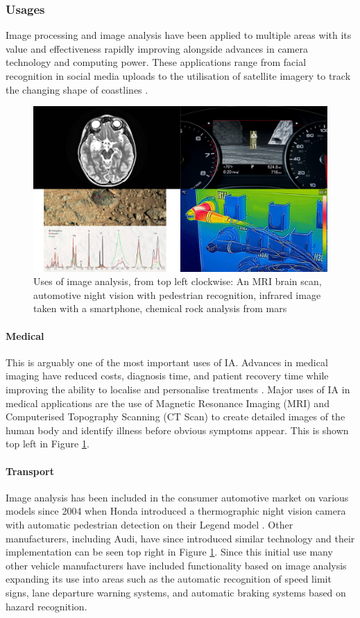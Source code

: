 	\subsubsection{Usages}
		Image processing and image analysis have been applied to multiple areas with its value and effectiveness rapidly improving alongside advances in camera technology and computing power. These applications range from facial recognition in social media uploads \citep{zuckerberg2011tagging} to the utilisation of satellite imagery to track the changing shape of coastlines \citep{costalimagery}.
		\begin{figure}[h!]
			\centering
			\includegraphics[width=15cm]{../images/4panel.png}
			\caption[Uses of image analysis]{Uses of image analysis, from top left clockwise: An MRI brain scan, automotive night vision with pedestrian recognition, infrared image taken with a smartphone, chemical rock analysis from mars}
			\label{fig:analysis_uses}
		\end{figure}
		\paragraph{Medical}
			This is arguably one of the most important uses of IA. Advances in medical imaging have reduced costs, diagnosis time, and patient recovery time while improving the ability to localise and personalise treatments \citep{esfmedical}. Major uses of IA in medical applications are the use of Magnetic Resonance Imaging (MRI) and Computerised Topography Scanning (CT Scan) to create detailed images of the human body and identify illness before obvious symptoms appear. This is shown top left in Figure \ref{fig:analysis_uses}.
		\paragraph{Transport}
			Image analysis has been included in the consumer automotive market on various models since 2004 when Honda introduced a thermographic night vision camera with automatic pedestrian detection on their Legend model \citep{hondanightvision}. Other manufacturers, including Audi, have since introduced similar technology and their implementation can be seen top right in Figure \ref{fig:analysis_uses}. Since this initial use many other vehicle manufacturers have included functionality based on image analysis expanding its use into areas such as the automatic recognition of speed limit signs, lane departure warning systems, and automatic braking systems based on hazard recognition.
